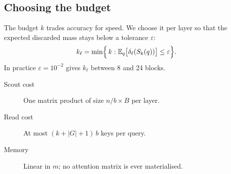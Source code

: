 \subsection{Choosing the budget}

The budget $k$ trades accuracy for speed. We choose it per layer so that the
expected discarded mass stays below a tolerance $\varepsilon$:
\[
  k_\ell = \min \Bigl\{\, k : \mathbb{E}_{q}\bigl[\delta_\ell(S_k(q))\bigr] \le \varepsilon \Bigr\}.
\]
In practice $\varepsilon = 10^{-2}$ gives $k_\ell$ between 8 and 24 blocks.

\begin{description}
  \item[Scout cost] One matrix product of size $n/b \times B$ per layer.
  \item[Read cost] At most $(k + |G| + 1)\, b$ keys per query.
  \item[Memory] Linear in $m$; no attention matrix is ever materialised.
\end{description}

